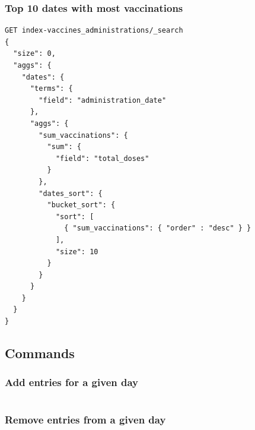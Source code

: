 \documentclass[12pt, a4paper]{article}
\begin{document}
\noindent
\blindtext

\subsubsection{Top 10 dates with most vaccinations}

\begin{tcolorbox}[fontupper=\scriptsize]
    \begin{verbatim}
GET index-vaccines_administrations/_search
{
  "size": 0,
  "aggs": {
    "dates": {
      "terms": { 
        "field": "administration_date" 
      },
      "aggs": {
        "sum_vaccinations": {
          "sum": {
            "field": "total_doses"
          }
        },
        "dates_sort": {
          "bucket_sort": {
            "sort": [
              { "sum_vaccinations": { "order" : "desc" } }
            ],
            "size": 10
          }
        }
      }
    }
  }
}
    \end{verbatim}
\end{tcolorbox}

\noindent
\blindtext

\subsection{Commands}


\subsubsection{Add entries for a given day}

\begin{tcolorbox}[fontupper=\scriptsize]
    \begin{verbatim}
    \end{verbatim}
\end{tcolorbox}

\noindent
\blindtext

\subsubsection{Remove entries from a given day}

\begin{tcolorbox}[fontupper=\scriptsize]
    \begin{verbatim}
    \end{verbatim}
\end{tcolorbox}

\noindent
\blindtext
\end{document}
